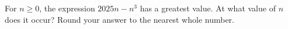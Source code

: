 For $n\ge0$, the expression $2025n-n^3$ has a greatest value. At what value of $n$ does it occur? Round your answer to the nearest whole number.
